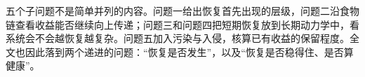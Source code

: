 五个子问题不是简单并列的内容。问题一给出恢复首先出现的层级，问题二沿食物链查看收益能否继续向上传递；问题三和问题四把短期恢复放到长期动力学中，看系统会不会越恢复越复杂。问题五加入污染与入侵，核算已有收益的保留程度。全文也因此落到两个递进的问题：“恢复是否发生”，以及“恢复是否稳得住、是否算健康”。
